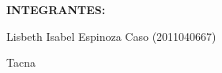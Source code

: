 \documentclass[12pt,letterpaper]{article}
\begin{document}
\begin{titlepage}
\begin{center}
\vspace*{0.4in}
\vspace*{0.1in}
\begin{large}
\textbf{INTEGRANTES:} \\
\begin{flushleft}
Lisbeth Isabel Espinoza Caso  (2011040667)\\

\centering  %
\vspace*{0.9in}
\begin{large}
Tacna
\end{large}

\end{flushleft}
\end{large}
\end{center}

\end{titlepage}


\tableofcontents %
\thispagestyle{empty} %
\newpage
\setcounter{page}{1} %



\end{document}
